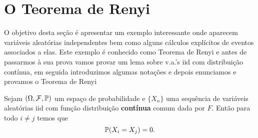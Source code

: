 \section{O Teorema de Renyi}\label{sec-teo-Renyi}

O objetivo desta seção é apresentar um exemplo 
interessante onde aparecem variáveis aleatórias 
independentes bem como alguns cálculos explícitos de eventos 
associados a elas. Este exemplo é conhecido como 
Teorema de Renyi e antes de passarmos à sua prova
vamos provar um lema sobre v.a.'s iid com distribuição 
contínua, em seguida introduzimos algumas notações e 
depois enunciamos e provamos o Teorema de Renyi




\begin{lema}
Sejam $(\Omega,\F,\P)$ um espaço de probabilidade e 
$\{X_n\}$ uma sequência de variáveis aleatórias
iid com função distribuição {\bf contínua} comum 
dada por $F$. Então para todo $i\neq j$ temos que
	\[
		\P(X_i=X_j)=0.
	\]
\end{lema}


